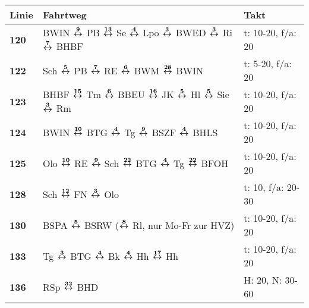 \begin{minipage}[t]{0.05\textwidth}
\phantom{Tor}
\end{minipage}
\begin{minipage}[t]{0.45\textwidth}
\begin{tabular}{>{\bfseries}L{1.2cm}L{9.0cm}L{3.0cm}}
{\bfseries Linie} & {\bfseries Fahrtweg} & {\bfseries Takt} \\
\hline
\bus{} 120    & BWIN $\xarwe{9}$ PB $\xarwe{13}$ Se $\xarwe{4}$ Lpo $\xarwe{3}$ BWED $\xarwe{3}$ Ri $\xarwe{7}$ BHBF                                                                & t: 10-20, f/a: 20          \\
\bus{} 122    & Sch $\xarwe{5}$ PB $\xarwe{7}$ RE $\xarwe{6}$ BWM $\xarwe{28}$ BWIN                                                                                                 & t: 5-20, f/a: 20           \\
\bus{} 123    & BHBF $\xarwe{15}$ Tm $\xarwe{6}$ BBEU $\xarwe{16}$ JK $\xarwe{5}$ Hl $\xarwe{5}$ Sie $\xarwe{3}$ Rm                                                                 & t: 10-20, f/a: 20          \\
\bus{} 124    & BWIN $\xarwe{10}$ BTG $\xarwe{4}$ Tg $\xarwe{9}$ BSZF $\xarwe{4}$ BHLS                                                                                              & t: 10-20, f/a: 20          \\
\bus{} 125    & Olo $\xarwe{10}$ RE $\xarwe{9}$ Sch $\xarwe{22}$ BTG $\xarwe{4}$ Tg $\xarwe{22}$ BFOH                                                                               & t: 10-20, f/a: 20          \\
\bus{} 128    & Sch $\xarwe{12}$ FN $\xarwe{3}$ Olo                                                                                                                 & t: 10, f/a: 20-30          \\
\bus{} 130    & BSPA $\xarwe{5}$ BSRW ($\xarwe{8}$ Rl, nur Mo-Fr zur HVZ)                                                                                                           & t: 10-20, f/a: 20          \\
\bus{} 133    & Tg $\xarwe{3}$ BTG $\xarwe{4}$ Bk $\xarwe{4}$ Hh $\xarwe{17}$ Hh                                                                                                    & t: 10-20, f/a: 20          \\
\bus{} 136    & RSp $\xarwe{32}$ BHD                                                                                                                                               & H: 20, N: 30-60            \\

\end{tabular}
\end{minipage}
